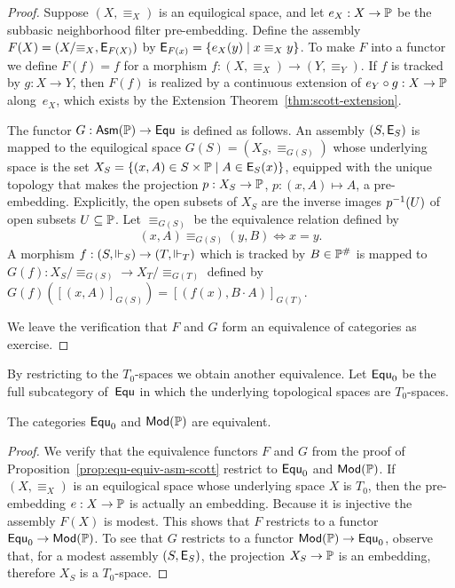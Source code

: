 \begin{proof}
  Suppose $(X, {\equiv_X})$ is an equilogical space, and let $e_X : X
  \to \mathbb{P}$ be the subbasic neighborhood filter pre-embedding.
  Define the assembly $F(X) = (X/{\equiv_X}, \mathsf{E}_{F(X)})$ by
  $\mathsf{E}_{F(x)} = \{e_X(y) \mid x \equiv_X y\}$. To make $F$ into a
  functor we define $F(f) = f$ for a morphism $f : (X, {\equiv_X}) \to
  (Y, {\equiv_Y})$. If $f$ is tracked by $g : X \to Y$, then $F(f)$ is
  realized by a continuous extension of $e_Y \circ g : X \to \mathbb{P}$
  along~$e_X$, which exists by the Extension
  Theorem~\ref{thm:scott-extension}.

  The functor $G : \mathsf{Asm}(\mathbb{P}) \to \mathsf{Equ}$ is defined as follows. An
  assembly $(S, \mathsf{E}_S)$ is mapped to the equilogical space $G(S) =
  (X_S, \equiv_{G(S)})$ whose underlying space is the set $X_S =
  \{(x,A) \in S \times \mathbb{P} \mid A \in \mathsf{E}_S(x)\}$, equipped with
  the unique topology that makes the projection $p : X_S \to \mathbb{P}$,
  $p : (x,A) \mapsto A$, a pre-embedding. Explicitly, the open subsets
  of $X_S$ are the inverse images $p^{-1}(U)$ of open subsets $U
  \subseteq \mathbb{P}$. Let $\equiv_{G(S)}$ be the equivalence relation
  defined by
  \begin{equation*}
    (x,A) \equiv_{G(S)} (y,B) \iff x = y.
  \end{equation*}
  A morphism $f : (S, {\Vdash_S}) \to (T, {\Vdash_T})$ which is tracked by
  $B \in \mathbb{P}^{\#}$ is mapped to $G(f) : X_S/{\equiv_{G(S)}} \to
  X_T/{\equiv_{G(T)}}$ defined by $G(f)([(x,A)]_{G(S)}) = [(f(x), B
  \cdot A)]_{G(T)}$.

  We leave the verification that $F$ and $G$ form an equivalence of
  categories as exercise.
\end{proof}

By restricting to the $T_0$-spaces we obtain another equivalence. Let
$\mathsf{Equ}_0$ be the full subcategory of~$\mathsf{Equ}$ in which the underlying
topological spaces are $T_0$-spaces.


\begin{proposition}
  \label{prop:equ0-equiv-mod-scott}
  The categories $\mathsf{Equ}_0$ and $\mathsf{Mod}(\mathbb{P})$ are equivalent.
\end{proposition}

\begin{proof}
  We verify that the equivalence functors $F$ and $G$ from the proof
  of Proposition~\ref{prop:equ-equiv-asm-scott} restrict to $\mathsf{Equ}_0$
  and $\mathsf{Mod}(\mathbb{P})$. If $(X, {\equiv_X})$ is an equilogical space
  whose underlying space $X$ is $T_0$, then the pre-embedding $e : X
  \to \mathbb{P}$ is actually an embedding. Because it is injective the
  assembly $F(X)$ is modest. This shows that $F$ restricts to a
  functor $\mathsf{Equ}_0 \to \mathsf{Mod}(\mathbb{P})$.
  To see that $G$ restricts to a functor $\mathsf{Mod}(\mathbb{P}) \to \mathsf{Equ}_0$,
  observe that, for a modest assembly $(S, \mathsf{E}_S)$, the projection
  $X_S \to \mathbb{P}$ is an embedding, therefore $X_S$ is a $T_0$-space.
\end{proof}

